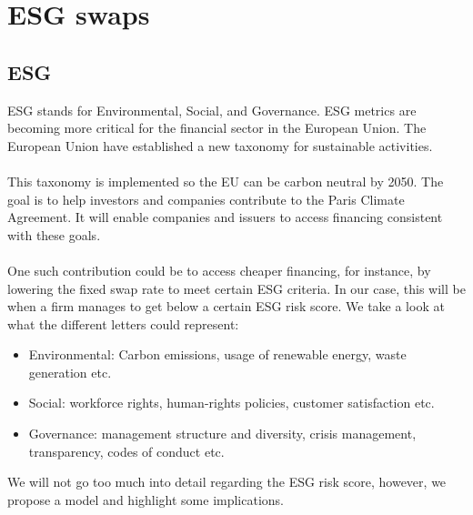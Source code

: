 \chapter{ESG swaps}
\label{chp_ESG_swaps}


\section{ESG}
ESG  stands for Environmental, Social, and Governance. ESG metrics are becoming more critical for the financial sector in the European Union. The European Union have established a new taxonomy \cite{EU:2021} for sustainable activities. 
\\~\\
This taxonomy is implemented so the EU can be carbon neutral by 2050. The goal is to help investors and companies contribute to the Paris Climate Agreement. It will enable companies and issuers to access financing consistent with these goals.
\\~\\ 
One such contribution could be to access cheaper financing, for instance, by lowering the fixed swap rate to meet certain ESG criteria. In our case, this will be when a firm manages to get below a certain ESG risk score. We take a look at what the different letters could represent:

\begin{itemize}
    \item Environmental: Carbon emissions, usage of renewable energy, waste generation etc. 
    \item Social: workforce rights, human-rights policies, customer satisfaction etc. 
    \item Governance: management structure and diversity, crisis management, transparency,  codes of conduct etc. 
\end{itemize}

We will not go too much into detail regarding the ESG risk score, however, we propose a model and highlight some implications. 

\newpage 

